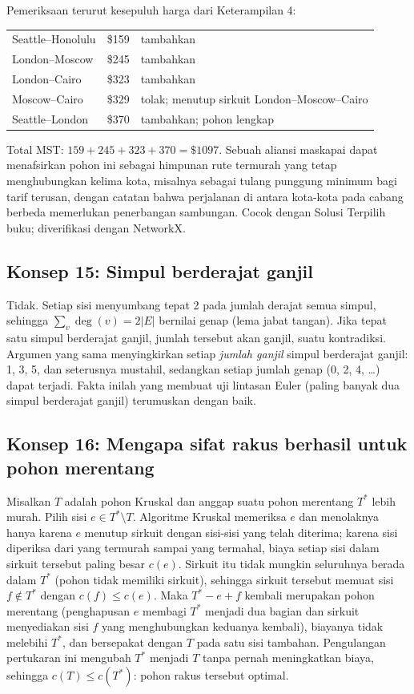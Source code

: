 Pemeriksaan terurut kesepuluh harga dari Keterampilan 4:
\begin{center}
\begin{tabular}{lll}
Seattle--Honolulu & \$159 & tambahkan \\
London--Moscow & \$245 & tambahkan \\
London--Cairo & \$323 & tambahkan \\
Moscow--Cairo & \$329 & tolak; menutup sirkuit London--Moscow--Cairo \\
Seattle--London & \$370 & tambahkan; pohon lengkap \\
\end{tabular}
\end{center}
Total MST: $159 + 245 + 323 + 370 = \$1097$. Sebuah aliansi maskapai dapat menafsirkan pohon ini sebagai himpunan rute termurah yang tetap menghubungkan kelima kota, misalnya sebagai tulang punggung minimum bagi tarif terusan, dengan catatan bahwa perjalanan di antara kota-kota pada cabang berbeda memerlukan penerbangan sambungan. Cocok dengan Solusi Terpilih buku; diverifikasi dengan NetworkX.

\subsection*{Konsep 15: Simpul berderajat ganjil}

Tidak. Setiap sisi menyumbang tepat 2 pada jumlah derajat semua simpul, sehingga $\sum_v \deg(v) = 2|E|$ bernilai genap (lema jabat tangan). Jika tepat satu simpul berderajat ganjil, jumlah tersebut akan ganjil, suatu kontradiksi. Argumen yang sama menyingkirkan setiap \emph{jumlah ganjil} simpul berderajat ganjil: 1, 3, 5, dan seterusnya mustahil, sedangkan setiap jumlah genap (0, 2, 4, \dots) dapat terjadi. Fakta inilah yang membuat uji lintasan Euler (paling banyak dua simpul berderajat ganjil) terumuskan dengan baik.

\subsection*{Konsep 16: Mengapa sifat rakus berhasil untuk pohon merentang}

Misalkan $T$ adalah pohon Kruskal dan anggap suatu pohon merentang $T^*$ lebih murah. Pilih sisi $e \in T^* \setminus T$. Algoritme Kruskal memeriksa $e$ dan menolaknya hanya karena $e$ menutup sirkuit dengan sisi-sisi yang telah diterima; karena sisi diperiksa dari yang termurah sampai yang termahal, biaya setiap sisi dalam sirkuit tersebut paling besar $c(e)$. Sirkuit itu tidak mungkin seluruhnya berada dalam $T^*$ (pohon tidak memiliki sirkuit), sehingga sirkuit tersebut memuat sisi $f \notin T^*$ dengan $c(f) \leq c(e)$. Maka $T^* - e + f$ kembali merupakan pohon merentang (penghapusan $e$ membagi $T^*$ menjadi dua bagian dan sirkuit menyediakan sisi $f$ yang menghubungkan keduanya kembali), biayanya tidak melebihi $T^*$, dan bersepakat dengan $T$ pada satu sisi tambahan. Pengulangan pertukaran ini mengubah $T^*$ menjadi $T$ tanpa pernah meningkatkan biaya, sehingga $c(T) \leq c(T^*)$: pohon rakus tersebut optimal.

